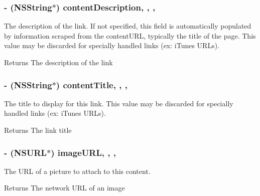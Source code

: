 \subsubsection[{content\+Description}]{\setlength{\rightskip}{0pt plus 5cm}-\/ (N\+S\+String$\ast$) content\+Description\hspace{0.3cm}{\ttfamily [read]}, {\ttfamily [write]}, {\ttfamily [nonatomic]}, {\ttfamily [copy]}}\label{interface_f_b_s_d_k_share_link_content_a1fef92d83f1e0a9f51c0923fd820ec41}
The description of the link.  If not specified, this field is automatically populated by information scraped from the content\+U\+R\+L, typically the title of the page. This value may be discarded for specially handled links (ex\+: i\+Tunes U\+R\+Ls). \begin{DoxyReturn}{Returns}
The description of the link 
\end{DoxyReturn}
\hypertarget{interface_f_b_s_d_k_share_link_content_acad99ec961a251713ec7118356ed6a2a}{}
\subsubsection[{content\+Title}]{\setlength{\rightskip}{0pt plus 5cm}-\/ (N\+S\+String$\ast$) content\+Title\hspace{0.3cm}{\ttfamily [read]}, {\ttfamily [write]}, {\ttfamily [nonatomic]}, {\ttfamily [copy]}}\label{interface_f_b_s_d_k_share_link_content_acad99ec961a251713ec7118356ed6a2a}
The title to display for this link.  This value may be discarded for specially handled links (ex\+: i\+Tunes U\+R\+Ls). \begin{DoxyReturn}{Returns}
The link title 
\end{DoxyReturn}
\hypertarget{interface_f_b_s_d_k_share_link_content_a7eb946e85589c6436ed65bf8f4166172}{}
\subsubsection[{image\+U\+R\+L}]{\setlength{\rightskip}{0pt plus 5cm}-\/ (N\+S\+U\+R\+L$\ast$) image\+U\+R\+L\hspace{0.3cm}{\ttfamily [read]}, {\ttfamily [write]}, {\ttfamily [nonatomic]}, {\ttfamily [copy]}}\label{interface_f_b_s_d_k_share_link_content_a7eb946e85589c6436ed65bf8f4166172}
The U\+R\+L of a picture to attach to this content. \begin{DoxyReturn}{Returns}
The network U\+R\+L of an image 
\end{DoxyReturn}
\hypertarget{interface_f_b_s_d_k_share_link_content_af2f0d6871f79841514d9631ef65af673}{}
